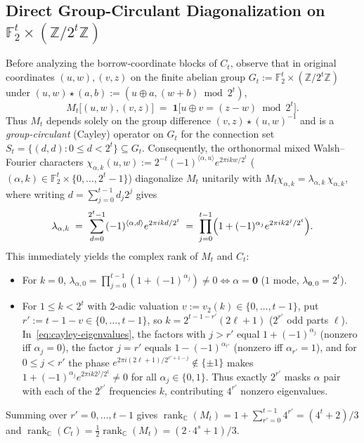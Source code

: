 \documentclass[11pt,reqno]{amsart}
\theoremstyle{definition}
\theoremstyle{remark}
\DeclareMathOperator{\rk}{rank}
\newcommand{\FF}{\mathbb{F}}
\newcommand{\ZZ}{\mathbb{Z}}
\newcommand{\CC}{\mathbb{C}}
\newcommand{\ind}{\mathbf{1}}
\newcommand{\zero}{\mathbf{0}}
\numberwithin{equation}{section}
\begin{document}
\subsection{Direct Group-Circulant Diagonalization on \texorpdfstring{$\FF_2^t \times (\ZZ/2^t\ZZ)$}{F\_2\^t x (Z/2\^t Z)}}
Before analyzing the borrow-coordinate blocks of $C_t$, observe that in original coordinates $(u, w), (v, z)$ on the finite abelian group $G_t := \FF_2^t \times (\ZZ/2^t\ZZ)$ under $(u, w) \star (a, b) := (u \oplus a, (w + b) \bmod 2^t)$,
\begin{equation}
  \label{eq:group-circulant}
  M_t\bigl[(u, w), (v, z)\bigr] \;=\; \ind\bigl[u \oplus v = (z - w) \bmod 2^t\bigr].
\end{equation}
Thus $M_t$ depends solely on the group difference $(v, z) \star (u, w)^{-1}$ and is a \emph{group-circulant} (Cayley) operator on $G_t$ for the connection set $S_t = \{(d, d) : 0 \le d < 2^t\} \subseteq G_t$. Consequently, the orthonormal mixed Walsh--Fourier characters $\chi_{\alpha, k}(u, w) := 2^{-t}(-1)^{\langle \alpha, u \rangle} e^{2\pi i k w / 2^t}$ ($(\alpha, k) \in \FF_2^t \times \{0, \dots, 2^t - 1\}$) diagonalize $M_t$ unitarily with $M_t \chi_{\alpha, k} = \lambda_{\alpha, k}\,\chi_{\alpha, k}$, where writing $d = \sum_{j=0}^{t-1} d_j 2^j$ gives
\begin{equation}
  \label{eq:cayley-eigenvalues}
  \lambda_{\alpha, k} \;=\; \sum_{d=0}^{2^t-1} (-1)^{\langle \alpha, d \rangle} e^{2\pi i k d / 2^t}
  \;=\; \prod_{j=0}^{t-1} \Bigl(1 + (-1)^{\alpha_j} e^{2\pi i k 2^j / 2^t}\Bigr).
\end{equation}
This immediately yields the complex rank of $M_t$ and $C_t$:
\begin{itemize}[leftmargin=2em]
  \item For $k = 0$, $\lambda_{\alpha, 0} = \prod_{j=0}^{t-1}(1 + (-1)^{\alpha_j}) \neq 0 \iff \alpha = \zero$ ($1$ mode, $\lambda_{\zero, 0} = 2^t$).
  \item For $1 \le k < 2^t$ with $2$-adic valuation $v := v_2(k) \in \{0, \dots, t - 1\}$, put $r' := t - 1 - v \in \{0, \dots, t - 1\}$, so $k = 2^{t-1-r'}(2\ell + 1)$ ($2^{r'}$ odd parts $\ell$). In~\eqref{eq:cayley-eigenvalues}, the factors with $j > r'$ equal $1 + (-1)^{\alpha_j}$ (nonzero iff $\alpha_j = 0$), the factor $j = r'$ equals $1 - (-1)^{\alpha_{r'}}$ (nonzero iff $\alpha_{r'} = 1$), and for $0 \le j < r'$ the phase $e^{2\pi i (2\ell+1)/2^{r'+1-j}} \notin \{\pm 1\}$ makes $1 + (-1)^{\alpha_j}e^{2\pi i k 2^j / 2^t} \neq 0$ for all $\alpha_j \in \{0, 1\}$. Thus exactly $2^{r'}$ masks $\alpha$ pair with each of the $2^{r'}$ frequencies $k$, contributing $4^{r'}$ nonzero eigenvalues.
\end{itemize}
Summing over $r' = 0, \dots, t - 1$ gives $\rk_{\CC}(M_t) = 1 + \sum_{r'=0}^{t-1} 4^{r'} = (4^t + 2)/3$ and $\rk_{\CC}(C_t) = \frac{1}{2}\rk_{\CC}(M_t) = (2\cdot 4^s + 1)/3$.
\end{document}
